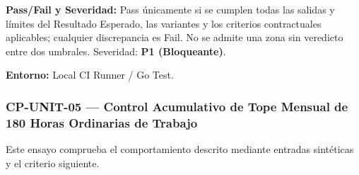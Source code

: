 \par\noindent\textbf{Pass/Fail y Severidad:} Pass únicamente si se cumplen todas las salidas y límites del Resultado Esperado, las variantes y los criterios contractuales aplicables; cualquier discrepancia es Fail. No se admite una zona sin veredicto entre dos umbrales. Severidad: \textbf{P1 (Bloqueante)}.\par
\par\noindent\textbf{Entorno:} Local CI Runner / Go Test.\par






\subsubsection*{CP-UNIT-05 — Control Acumulativo de Tope Mensual de 180 Horas Ordinarias de Trabajo}\label{sec:9-cp-unit-05}
Este ensayo comprueba el comportamiento descrito mediante entradas sintéticas y el criterio siguiente.

